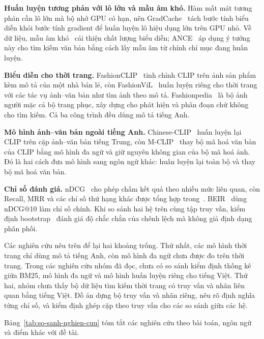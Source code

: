 \textbf{Huấn luyện tương phản với lô lớn và mẫu âm khó.} Hàm mất mát tương phản cần lô lớn mà bộ nhớ GPU có hạn, nên GradCache~\cite{gao2021gradcache} tách bước tính biểu diễn khỏi bước tính gradient để huấn luyện lô hiệu dụng lớn trên GPU nhỏ. Về dữ liệu, mẫu âm khó~\cite{robinson2021hardneg} cải thiện chất lượng biểu diễn; ANCE~\cite{xiong2021ance} áp dụng ý tưởng này cho tìm kiếm văn bản bằng cách lấy mẫu âm từ chính chỉ mục đang huấn luyện.

\textbf{Biểu diễn cho thời trang.} FashionCLIP~\cite{chia2022fashionclip} tinh chỉnh CLIP trên ảnh sản phẩm kèm mô tả của một nhà bán lẻ, còn FashionViL~\cite{han2022fashionvil} huấn luyện riêng cho thời trang với các tác vụ ảnh--văn bản như tìm ảnh theo mô tả. Fashionpedia~\cite{jia2020fashionpedia} là bộ ảnh người mặc cả bộ trang phục, xây dựng cho phát hiện và phân đoạn chứ không cho tìm kiếm. Cả ba công trình đều dùng mô tả tiếng Anh.

\textbf{Mô hình ảnh--văn bản ngoài tiếng Anh.} Chinese-CLIP~\cite{yang2022chineseclip} huấn luyện lại CLIP trên cặp ảnh--văn bản tiếng Trung, còn M-CLIP~\cite{carlsson2022mclip} thay bộ mã hoá văn bản của CLIP bằng mô hình đa ngữ và giữ nguyên không gian của bộ mã hoá ảnh. Đó là hai cách đưa mô hình sang ngôn ngữ khác: huấn luyện lại toàn bộ và thay bộ mã hoá văn bản.

\textbf{Chỉ số đánh giá.} nDCG~\cite{jarvelin2002ndcg} cho phép chấm kết quả theo nhiều mức liên quan, còn Recall, MRR và các chỉ số thứ hạng khác được tổng hợp trong~\cite{manning2008ir}. BEIR~\cite{thakur2021beir} dùng nDCG@10 làm chỉ số chính. Khi so sánh hai hệ trên cùng tập truy vấn, kiểm định bootstrap~\cite{efron1993bootstrap} đánh giá độ chắc chắn của chênh lệch mà không giả định dạng phân phối.

Các nghiên cứu nêu trên để lại hai khoảng trống. Thứ nhất, các mô hình thời trang chỉ dùng mô tả tiếng Anh, còn mô hình đa ngữ chưa được đo trên thời trang. Trong các nghiên cứu nhóm đã đọc, chưa có so sánh kiểm định thống kê giữa BM25, mô hình đa ngữ và mô hình huấn luyện riêng cho tiếng Việt. Thứ hai, nhóm chưa thấy bộ dữ liệu tìm kiếm thời trang có truy vấn và nhãn liên quan bằng tiếng Việt. Đồ án dựng bộ truy vấn và nhãn riêng, nêu rõ định nghĩa từng chỉ số, và kiểm định ghép cặp theo truy vấn cho các so sánh giữa các hệ.

Bảng~\ref{tab:so-sanh-nghien-cuu} tóm tắt các nghiên cứu theo bài toán, ngôn ngữ và điểm khác với đề tài.

